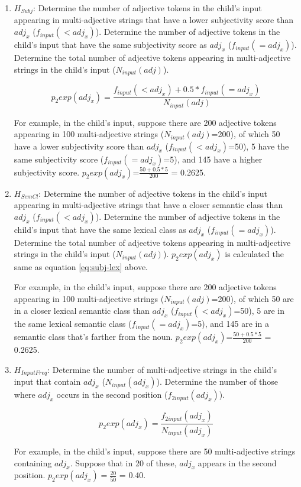 \documentclass{article}
\begin{document}
\begin{enumerate}
\item{
$H_{Subj}$: Determine the number of adjective tokens in the child's input appearing in multi-adjective strings that have a lower subjectivity score than $adj_x$ ($f_{input}(<adj_x)$). Determine the number of adjective tokens in the child's input that have the same subjectivity score as $adj_x$ ($f_{input}(=adj_x)$). Determine the total number of adjective tokens appearing in multi-adjective strings in the child's input ($N_{input}(adj)$).

\begin{equation}
\label{eq:subj-lex}
p_2exp(adj_x) = \frac{f_{input}(<adj_x) + 0.5*f_{input}(=adj_x)}{N_{input}(adj)}
\end{equation}


For example, in the child's input, suppose there are 200 adjective tokens appearing in 100 multi-adjective strings ($N_{input}(adj)$=200), of which 50 have a lower subjectivity score than $adj_x$ ($f_{input}(<adj_x)$=50), 5 have the same subjectivity score ($f_{input}(=adj_x)$=5), and 145 have a higher subjectivity score. $p_2exp(adj_x)$=$\frac{50+0.5*5}{200}$ = 0.2625.
}

\item{
$H_{SemCl}$: Determine the number of adjective tokens in the child's input appearing in multi-adjective strings that have a closer semantic class than $adj_x$ ($f_{input}(<adj_x)$). Determine the number of adjective tokens in the child's input that have the same lexical class as $adj_x$ ($f_{input}(=adj_x)$). Determine the total number of adjective tokens appearing in multi-adjective strings in the child's input ($N_{input}(adj)$). $p_2exp(adj_x)$ is calculated the same as equation \eqref{eq:subj-lex} above.

For example, in the child's input, suppose there are 200 adjective tokens appearing in 100 multi-adjective strings ($N_{input}(adj)$=200), of which 50 are in a closer lexical semantic class than $adj_x$ ($f_{input}(<adj_x)$=50), 5 are in the same lexical semantic class ($f_{input}(=adj_x)$=5), and 145 are in a semantic class that's farther from the noun. $p_2exp(adj_x)$=$\frac{50+0.5*5}{200}$ = 0.2625.
}

\item{
$H_{InputFreq}$: Determine the number of multi-adjective strings in the child's input that contain $adj_x$ ($N_{input}(adj_x)$). Determine the number of those where $adj_x$ occurs in the second position ($f_{2input}(adj_x)$).

\begin{equation}
\label{eq:base}
p_2exp(adj_x) = \frac{f_{2input}(adj_x)}{N_{input}(adj_x)}
\end{equation}

For example, in the child's input, suppose there are 50 multi-adjective strings containing $adj_x$. Suppose that in 20 of these, $adj_x$ appears in the second position. $p_2exp(adj_x) = \frac{20}{50}$ = 0.40.

}

\end{enumerate}
\end{document}
